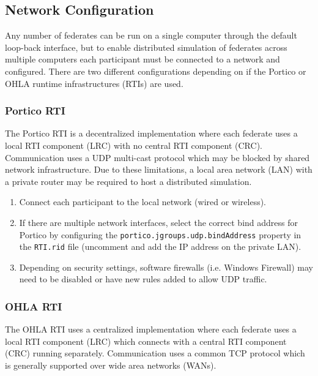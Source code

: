 \documentclass[]{article}
\begin{document}
\subsection{Network Configuration}

Any number of federates can be run on a single computer through the default loop-back interface, but to enable distributed simulation of federates across multiple computers each participant must be connected to a network and configured. There are two different configurations depending on if the Portico or OHLA runtime infrastructures (RTIs) are used.

\subsubsection{Portico RTI}

The Portico RTI is a decentralized implementation where each federate uses a local RTI component (LRC) with no central RTI component (CRC). Communication uses a UDP multi-cast protocol which may be blocked by shared network infrastructure. Due to these limitations, a local area network (LAN) with a private router may be required to host a distributed simulation.

\begin{enumerate}
\item Connect each participant to the local network (wired or wireless).
\item If there are multiple network interfaces, select the correct bind address for Portico by configuring the \texttt{portico.jgroups.udp.bindAddress} property in the \texttt{RTI.rid} file (uncomment and add the IP address on the private LAN).
\item Depending on security settings, software firewalls (i.e. Windows Firewall) may need to be disabled or have new rules added to allow UDP traffic.
\end{enumerate}

\subsubsection{OHLA RTI}

The OHLA RTI uses a centralized implementation where each federate uses a local RTI component (LRC) which connects with a central RTI component (CRC) running separately. Communication uses a common TCP protocol which is generally supported over wide area networks (WANs). 
\end{document}
